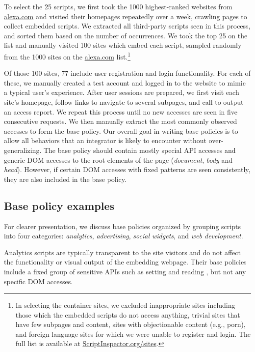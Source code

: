 To select the 25 scripts, we first took the 1000 highest-ranked websites
from \url{alexa.com} and visited their homepages repeatedly over a week,
crawling pages to collect embedded scripts.  We extracted all
third-party scripts seen in this process, and sorted them based on the
number of occurrences.  We took the top 25 on the list and manually
visited 100 sites which embed each script, sampled randomly from the 1000 sites on the \url{alexa.com} list.\footnote{In selecting the container sites, we excluded
  inappropriate sites including those which the embedded scripts do not
  access anything, trivial sites that have few subpages and content,
  sites with objectionable content (e.g., porn), and foreign language
  sites for which we were unable to register and login.  The full list is available at \renewcommand*{\UrlFont}{\smaller\tt\relax}\url{ScriptInspector.org/sites}.}

\renewcommand*{\UrlFont}{\normalsize\tt\relax}

Of those 100 sites, 77 include user registration and login
functionality.  For each of these, we manually created a test account
and logged in to the website to mimic a typical user's experience.
After user sessions are prepared, we first visit each site's homepage,
follow links to navigate to several subpages, and call
 to output an access report.  We repeat this
process until no new accesses are seen in five consecutive requests.  We
then manually extract the most commonly observed accesses to form the base
policy.  Our overall goal in writing base policies is to allow all
behaviors that an integrator is likely to encounter without
over-generalizing.  The base policy should contain mostly special API
accesses and generic DOM accesses to the root elements of the page
(\emph{document}, \emph{body} and \emph{head}).  However, if certain DOM
accesses with fixed patterns are seen consistently, they are also
included in the base policy.

\subsection{Base policy examples}  

For clearer presentation, we discuss base policies organized by grouping
scripts into four categories: \emph{analytics}, \emph{advertising},
\emph{social widgets}, and \emph{web development}.

 Analytics scripts are typically transparent to
the site visitors and do not affect the functionality or visual
output of the embedding webpage.  Their base policies include a fixed
group of sensitive APIs such as setting and reading
, but not any specific DOM accesses.

